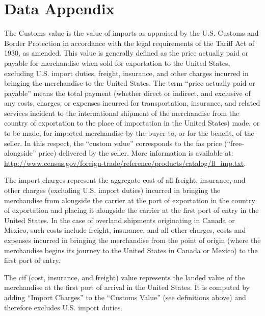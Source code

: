 \documentclass[a4paper,11pt]{article}
\begin{document}
\newpage


\appendix

\clearpage

\setcounter{table}{0}
\renewcommand{\thefigure}{A.\arabic{figure}}
\renewcommand{\thetable}{A.\arabic{table}}


\section{Data Appendix \label{app:data}}


The Customs value is the value of imports as appraised by the U.S.
Customs and Border Protection in accordance with the legal requirements of the Tariff Act of 1930, as amended.
This value is generally defined as the price actually paid or payable for merchandise when sold for exportation to the United States, excluding U.S.
import duties, freight, insurance, and other charges incurred in bringing the merchandise to the United States.
The term ``price actually paid or payable'' means the total payment (whether direct or indirect, and exclusive of any costs, charges, or expenses incurred for transportation, insurance, and related services incident to the international shipment of the merchandise from the country of exportation to the place of importation in the United States) made, or to be made, for imported merchandise by the buyer to, or for the benefit, of the seller.
In this respect, the ``custom value'' corresponds to the fas price (``free-alongside'' price) delivered by the seller.
More information is available at: \url{http://www.census.gov/foreign-trade/reference/products/catalog/fl_imp.txt}.

The import charges represent the aggregate cost of all freight, insurance, and other charges (excluding U.S.
import duties) incurred in bringing the merchandise from alongside the carrier at the port of exportation in the country of exportation and placing it alongside the carrier at the first port of entry in the United States.
In the case of overland shipments originating in Canada or Mexico, such costs include freight, insurance, and all other charges, costs and expenses incurred in bringing the merchandise from the point of origin (where the merchandise begins its journey to the United States in Canada or Mexico) to the first port of entry.

The cif (cost, insurance, and freight) value represents the landed value of the merchandise at the first port of arrival in the United States.
It is computed by adding ``Import Charges'' to the ``Customs Value'' (see definitions above) and therefore excludes U.S.
import duties.
\end{document}
